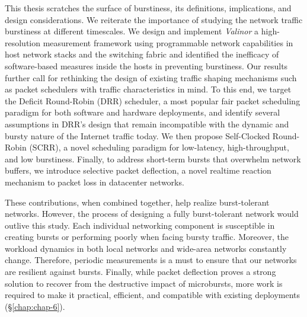 This thesis scratches the surface of burstiness, its definitions, implications, and design considerations.
We reiterate the importance of studying the network traffic burstiness at different timescales. We design and implement \textit{Valinor} a high-resolution measurement framework using programmable network capabilities in host network stacks and the switching fabric and identified the inefficacy of software-based measures inside the hosts in preventing burstiness. Our results further call for rethinking the design of existing traffic shaping mechanisms such as packet schedulers with traffic characteristics in mind. To this end, we target the Deficit Round-Robin (DRR) scheduler, a most popular fair packet scheduling paradigm for both software and hardware deployments, and identify several assumptions in DRR's design that remain incompatible with the dynamic and bursty nature of the Internet traffic today. We then propose Self-Clocked Round-Robin (SCRR), a novel scheduling paradigm for low-latency, high-throughput, and low burstiness. Finally, to address short-term bursts that overwhelm network buffers, we introduce selective packet deflection, a novel realtime reaction mechanism to packet loss in datacenter networks.

These contributions, when combined together, help realize burst-tolerant networks. However, the process of designing a fully burst-tolerant network would outlive this study. Each individual networking component is susceptible in creating bursts or performing poorly when facing bursty traffic. Moreover, the workload dynamics in both local networks and wide-area networks constantly change. Therefore, periodic measurements is a must to ensure that our networks are resilient against bursts. Finally, while packet deflection proves a strong solution to recover from the destructive impact of microbursts, more work is required to make it practical, efficient, and compatible with existing deployments (\S\ref{chap:chap-6}).